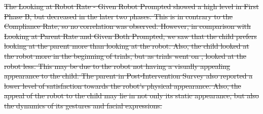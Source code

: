 \documentclass{ut-thesis}
\providecommand{\DIFdeltex}[1]{{\protect\color{red}\sout{#1}}}                      %
\providecommand{\DIFdel}[1]{\texorpdfstring{\DIFdeltex{#1}}{}} %
\begin{document}
\DIFdel{The Looking at Robot Rate - Given Robot Prompted showed a high level in First Phase B, but decreased in the later two phases.  This is in contrary to the Compliance Rate, so no correlation was observed.  However, in comparison with Looking at Parent Rate and Given Both Prompted, we saw that the child prefers looking at the parent more than looking at the robot.  Also, the child looked at the robot more in the beginning of trials, but as trials went on , looked at the robot less.  This may be due to the robot not having a visually appealing appearance to the child.  The parent in Post-Intervention Survey also reported a lower level of satisfaction towards the robot's physical appearance.  Also, the appeal of the robot to the child may lie in not only its static appearance, but also the dynamics of its gestures and facial expressions.  }%

\end{document}
